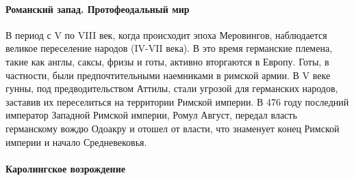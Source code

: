 \paragraph{Романский запад. Протофеодальный мир}

В период с V по VIII век, когда происходит эпоха Меровингов, наблюдается великое переселение народов (IV-VII века). В это время германские племена, такие как англы, саксы, фризы и готы, активно вторгаются в Европу. Готы, в частности, были предпочтительными наемниками в римской армии. В V веке гунны, под предводительством Аттилы, стали угрозой для германских народов, заставив их переселиться на территории Римской империи. В 476 году последний император Западной Римской империи, Ромул Август, передал власть германскому вождю Одоакру и отошел от власти, что знаменует конец Римской империи и начало Средневековья.

\paragraph{Каролингское возрождение}

